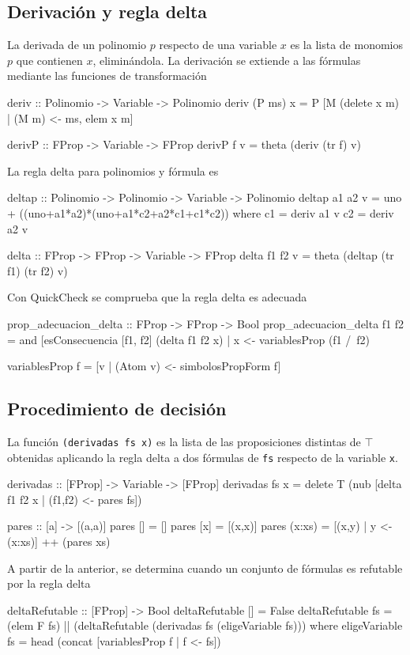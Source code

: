 \documentclass{llncs}
\begin{document}
\subsection{Derivación y regla delta}

La derivada de un polinomio $p$ respecto de una variable $x$ es la lista de
monomios $p$ que contienen $x$, eliminándola. La derivación se extiende a las
fórmulas mediante las funciones de transformación
\begin{code}
deriv :: Polinomio -> Variable -> Polinomio
deriv (P ms) x = P [M (delete x m) | (M m) <- ms, elem x m]

derivP :: FProp -> Variable -> FProp
derivP f v = theta (deriv (tr f) v)
\end{code}

La regla delta para polinomios y fórmula es
\begin{code}
deltap :: Polinomio -> Polinomio -> Variable -> Polinomio
deltap a1 a2 v = uno + ((uno+a1*a2)*(uno+a1*c2+a2*c1+c1*c2))
    where
      c1 = deriv a1 v
      c2 = deriv a2 v

delta :: FProp -> FProp -> Variable -> FProp
delta f1 f2 v = theta (deltap (tr f1) (tr f2) v)   
\end{code}

Con QuickCheck se comprueba que la regla delta es adecuada
\begin{code}
prop_adecuacion_delta :: FProp -> FProp -> Bool
prop_adecuacion_delta f1 f2 = 
    and [esConsecuencia [f1, f2] (delta f1 f2 x) |
         x <- variablesProp (f1 /\ f2)

variablesProp f = [v | (Atom v) <- simbolosPropForm f]
\end{code}

\subsection{Procedimiento de decisión}

La función \verb|(derivadas fs x)| es la lista de las proposiciones distintas
de $\top$ obtenidas aplicando la regla delta a dos fórmulas de \verb|fs|
respecto de la variable 
\verb|x|.
\begin{code}
derivadas :: [FProp] -> Variable -> [FProp]
derivadas fs x = 
   delete T (nub [delta f1 f2 x | (f1,f2) <- pares fs])

pares :: [a] -> [(a,a)]
pares []  = []
pares [x] = [(x,x)]
pares (x:xs) = [(x,y) | y <- (x:xs)] ++ (pares xs)
\end{code}
A partir de la anterior, se determina cuando un conjunto de fórmulas es
refutable por la regla delta
\begin{code}
deltaRefutable :: [FProp] -> Bool
deltaRefutable [] = False
deltaRefutable fs =
    (elem F fs) || 
    (deltaRefutable (derivadas fs (eligeVariable fs)))
    where eligeVariable fs = 
             head (concat [variablesProp f | f <- fs])
\end{code}
\end{document}
